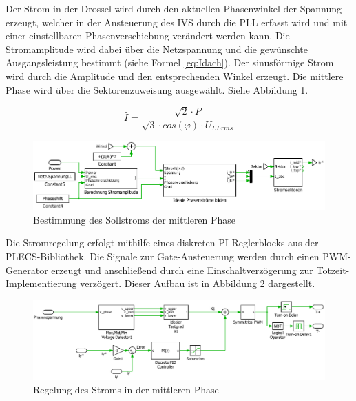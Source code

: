 			Der Strom in der Drossel wird durch den aktuellen Phasenwinkel der Spannung erzeugt, welcher in der Ansteuerung des IVS durch die PLL erfasst wird und mit einer einstellbaren Phasenverschiebung verändert werden kann. Die Stromamplitude wird dabei über die Netzspannung und die gewünschte Ausgangsleistung bestimmt (siehe Formel \ref{eq:Idach}). Der sinusförmige Strom wird durch die Amplitude und den entsprechenden Winkel erzeugt. Die mittlere Phase wird über die Sektorenzuweisung ausgewählt. Siehe Abbildung \ref{fig:plecsiafiy}. 
		
		\begin{equation}
			\label{eq:Idach}
			 \hat{I} = \dfrac{\sqrt{2} \cdot P   }{ \sqrt{3} \cdot cos(\varphi) \cdot  U_{LLrms} }
		\end{equation}
		
		\begin{figure}
			\centering
			\includegraphics[width=1\linewidth]{content/Grafiken/PlecsIAFiy}
			\caption{Bestimmung des Sollstroms der mittleren Phase}
			\label{fig:plecsiafiy}
		\end{figure}
		
Die Stromregelung erfolgt mithilfe eines diskreten PI-Reglerblocks aus der PLECS-Bibliothek. Die Signale zur Gate-Ansteuerung werden durch einen PWM-Generator erzeugt und anschließend durch eine Einschaltverzögerung zur Totzeit-Implementierung verzögert. Dieser Aufbau ist in Abbildung \ref{fig:plecsiafivsk1} dargestellt. 
		\begin{figure}
			\centering
			\includegraphics[width=1\linewidth]{content/Grafiken/PlecsIAFivsK1}
			\caption{Regelung des Stroms in der mittleren Phase}
			\label{fig:plecsiafivsk1}
		\end{figure}
		
	

